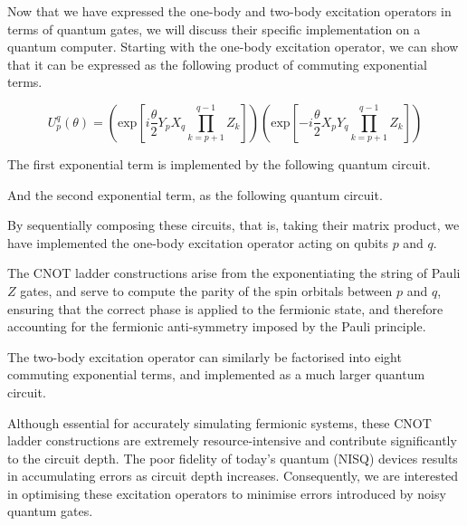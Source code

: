 Now that we have expressed the one-body and two-body excitation operators in terms of quantum gates, we will discuss their specific implementation on a quantum computer. Starting with the one-body excitation operator, we can show that it can be expressed as the following product of commuting exponential terms.

\begin{equation*}
    U^q_p (\theta) =
    \left( \text{exp} \left[
    i \frac{\theta}{2} Y_p X_q \prod_{k=p+1}^{q-1} Z_k \right] \right)
    \left( \text{exp} \left[ -
    i \frac{\theta}{2} X_p Y_q \prod_{k=p+1}^{q-1} Z_k \right] \right)
\end{equation*}

The first exponential term is implemented by the following quantum circuit.


And the second exponential term, as the following quantum circuit.


By sequentially composing these circuits, that is, taking their matrix product, we have implemented the one-body excitation operator acting on qubits $p$ and $q$.


The CNOT ladder constructions arise from the exponentiating the string of Pauli $Z$ gates, and serve to compute the parity of the spin orbitals between $p$ and $q$, ensuring that the correct phase is applied to the fermionic state, and therefore accounting for the fermionic anti-symmetry imposed by the Pauli principle.

The two-body excitation operator can similarly be factorised into eight commuting exponential terms, and implemented as a much larger quantum circuit.


Although essential for accurately simulating fermionic systems, these CNOT ladder constructions are extremely resource-intensive and contribute significantly to the circuit depth. The poor fidelity of today's quantum (NISQ) devices results in accumulating errors as circuit depth increases. Consequently, we are interested in optimising these excitation operators to minimise errors introduced by noisy quantum gates.

